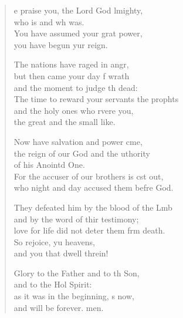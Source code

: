 \settowidth{\versewidth}{The time to reward your servants the prophets +}
\begin{verse}%
  \begin{patverse}
e praise you, the Lord God lmighty,\Med\\
who is and wh was.\\
You have assumed your grat power,\Med\\
you have begun yur reign.

The nations have raged in angr,\Flex\\
but then came your day f wrath\Med\\
and the moment to judge th dead:\\
The time to reward your servants the prophts\Flex\\
and the holy ones who rvere you,\Med\\
the great and the small like.

Now have salvation and power cme,\Flex\\
the reign of our God and the uthority\Med\\
of his Anointd One.\\
For the accuser of our brothers is cst out,\Med\\
who night and day accused them befre God.

They defeated him by the blood of the Lmb\Flex\\
and by the word of thir testimony;\Med\\
love for life did not deter them frm death.\\
So rejoice, yu heavens,\Med\\
and you that dwell threin!

Glory to the Father and to th Son,\Med\\
and to the Hol Spirit:\\
as it was in the beginning, s now,\Med\\
and will be forever. men. 
  \end{patverse}
\end{verse}

